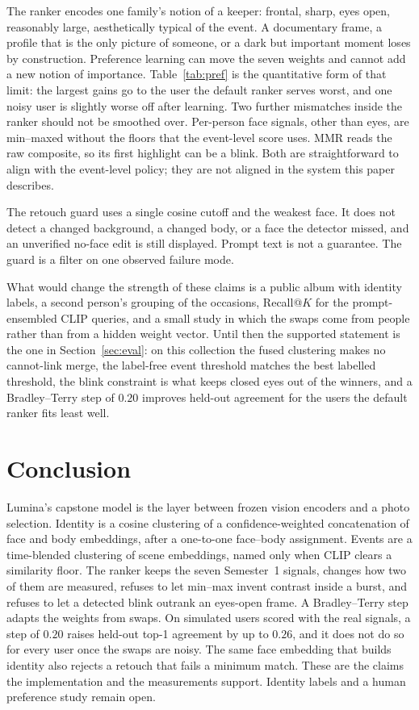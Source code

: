 \documentclass[conference]{IEEEtran}
\begin{document}
The ranker encodes one family's notion of a keeper: frontal, sharp, eyes open,
reasonably large, aesthetically typical of the event. A documentary frame, a
profile that is the only picture of someone, or a dark but important moment
loses by construction. Preference learning can move the seven weights and
cannot add a new notion of importance. Table~\ref{tab:pref} is the quantitative
form of that limit: the largest gains go to the user the default ranker serves
worst, and one noisy user is slightly worse off after learning. Two further mismatches inside the ranker
should not be smoothed over. Per-person face signals, other than eyes, are
min--maxed without the floors that the event-level score uses. MMR reads the
raw composite, so its first highlight can be a blink. Both are straightforward
to align with the event-level policy; they are not aligned in the system this
paper describes.

The retouch guard uses a single cosine cutoff and the weakest face. It does
not detect a changed background, a changed body, or a face the detector
missed, and an unverified no-face edit is still displayed. Prompt text is not
a guarantee. The guard is a filter on one observed failure mode.

What would change the strength of these claims is a public album with identity
labels, a second person's grouping of the occasions, Recall@$K$ for the
prompt-ensembled CLIP queries, and a small study in which the swaps come from
people rather than from a hidden weight vector. Until then the supported
statement is the one in Section~\ref{sec:eval}: on this collection the fused
clustering makes no cannot-link merge, the label-free event threshold matches
the best labelled threshold, the blink constraint is what keeps closed eyes
out of the winners, and a Bradley--Terry step of $0.20$ improves held-out
agreement for the users the default ranker fits least well.

\section{Conclusion}

Lumina's capstone model is the layer between frozen vision encoders and a
photo selection. Identity is a cosine clustering of a confidence-weighted
concatenation of face and body embeddings, after a one-to-one face--body
assignment. Events are a time-blended clustering of scene embeddings, named
only when CLIP clears a similarity floor. The ranker keeps the seven Semester~1
signals, changes how two of them are measured, refuses to let min--max invent
contrast inside a burst, and refuses to let a detected blink outrank an
eyes-open frame. A Bradley--Terry step adapts the weights from swaps. On simulated users scored
with the real signals, a step of $0.20$ raises held-out top-1 agreement by up
to $0.26$, and it does not do so for every user once the swaps are noisy. The
same face embedding that builds identity also rejects a retouch that fails a
minimum match. These are the claims the implementation and the measurements
support. Identity labels and a human preference study remain open.
\end{document}
